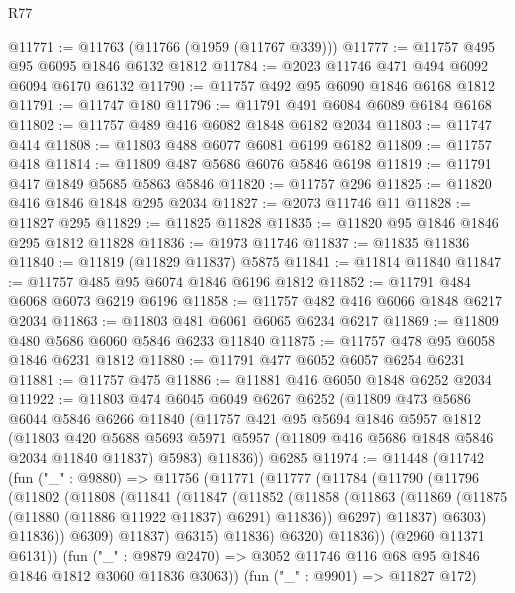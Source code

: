 \begin{lexlean}{R77}
\begin{coremodule}
@11771 := @11763 (@11766 (@1959 (@11767 @339)))
@11777 := @11757 @495 @95 @6095 @1846 @6132 @1812
@11784 := @2023 @11746 @471 @494 @6092 @6094 @6170 @6132
@11790 := @11757 @492 @95 @6090 @1846 @6168 @1812
@11791 := @11747 @180
@11796 := @11791 @491 @6084 @6089 @6184 @6168
@11802 := @11757 @489 @416 @6082 @1848 @6182 @2034
@11803 := @11747 @414
@11808 := @11803 @488 @6077 @6081 @6199 @6182
@11809 := @11757 @418
@11814 := @11809 @487 @5686 @6076 @5846 @6198
@11819 := @11791 @417 @1849 @5685 @5863 @5846
@11820 := @11757 @296
@11825 := @11820 @416 @1846 @1848 @295 @2034
@11827 := @2073 @11746 @11
@11828 := @11827 @295
@11829 := @11825 @11828
@11835 := @11820 @95 @1846 @1846 @295 @1812 @11828
@11836 := @1973 @11746
@11837 := @11835 @11836
@11840 := @11819 (@11829 @11837) @5875
@11841 := @11814 @11840
@11847 := @11757 @485 @95 @6074 @1846 @6196 @1812
@11852 := @11791 @484 @6068 @6073 @6219 @6196
@11858 := @11757 @482 @416 @6066 @1848 @6217 @2034
@11863 := @11803 @481 @6061 @6065 @6234 @6217
@11869 := @11809 @480 @5686 @6060 @5846 @6233 @11840
@11875 := @11757 @478 @95 @6058 @1846 @6231 @1812
@11880 := @11791 @477 @6052 @6057 @6254 @6231
@11881 := @11757 @475
@11886 := @11881 @416 @6050 @1848 @6252 @2034
@11922 := @11803
    @474
    @6045
    @6049
    @6267
    @6252
    (@11809
      @473
      @5686
      @6044
      @5846
      @6266
      @11840
      (@11757
        @421
        @95
        @5694
        @1846
        @5957
        @1812
        (@11803
          @420
          @5688
          @5693
          @5971
          @5957
          (@11809 @416 @5686 @1848 @5846 @2034 @11840 @11837)
          @5983)
        @11836))
    @6285
@11974 := @11448
    (@11742
      (fun ("_" : @9880) =>
      @11756
        (@11771
          (@11777
            (@11784
              (@11790
                (@11796
                  (@11802
                    (@11808
                      (@11841
                        (@11847
                          (@11852
                            (@11858
                              (@11863
                                (@11869 (@11875 (@11880 (@11886 @11922 @11837) @6291) @11836))
                                @6297)
                              @11837)
                            @6303)
                          @11836))
                      @6309)
                    @11837)
                  @6315)
                @11836)
              @6320)
            @11836))
        (@2960 @11371 @6131))
      (fun ("_" : @9879 @2470) => @3052 @11746 @116 @68 @95 @1846 @1846 @1812 @3060 @11836 @3063))
    (fun ("_" : @9901) => @11827 @172)

\end{coremodule}
\end{lexlean}
